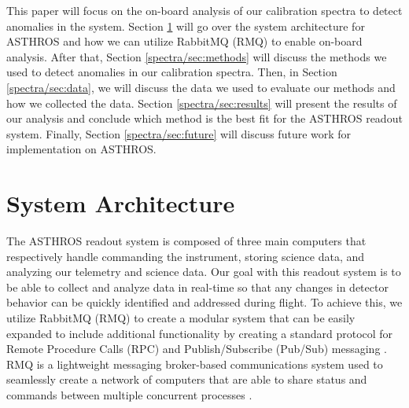 This paper will focus on the on-board analysis of our calibration spectra to detect anomalies in the system.
Section \ref{spectra/sec:system} will go over the system architecture for ASTHROS and how we can utilize RabbitMQ (RMQ) to enable on-board analysis.
After that, Section \ref{spectra/sec:methods} will discuss the methods we used to detect anomalies in our calibration spectra.
Then, in Section \ref{spectra/sec:data}, we will discuss the data we used to evaluate our methods and how we collected the data.
Section \ref{spectra/sec:results} will present the results of our analysis and conclude which method is the best fit for the ASTHROS readout system.
Finally, Section \ref{spectra/sec:future} will discuss future work for implementation on ASTHROS. 

\section{System Architecture}
\label{spectra/sec:system}
The ASTHROS readout system is composed of three main computers that respectively handle commanding the instrument, storing science data, and analyzing our telemetry and science data. 
Our goal with this readout system is to be able to collect and analyze data in real-time so that any changes in detector behavior can be quickly identified and addressed during flight. 
To achieve this, we utilize RabbitMQ (RMQ) to create a modular system that can be easily expanded to include additional functionality by creating a standard protocol for Remote Procedure Calls (RPC) and Publish/Subscribe (Pub/Sub) messaging \parencite{dobbelaere2017kafkaversusrabbitmq}.
RMQ is a lightweight messaging broker-based communications system used to seamlessly create a network of computers that are able to share status and commands between multiple concurrent processes \parencite{thompson2024architecture}.

